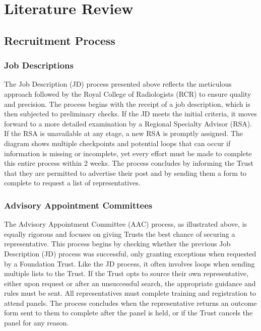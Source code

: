 \section{Literature Review}
\subsection{Recruitment Process}
\subsubsection{Job Descriptions}
    \noindent
{}
The Job Description (JD) process presented above reflects the meticulous approach followed by the Royal College of Radiologists (RCR) to ensure quality and precision. The process begins with the receipt of a job description, which is then subjected to preliminary checks. If the JD meets the initial criteria, it moves forward to a more detailed examination by a Regional Specialty Advisor (RSA). If the RSA is unavailable at any stage, a new RSA is promptly assigned. The diagram shows multiple checkpoints and potential loops that can occur if information is missing or incomplete, yet every effort must be made to complete this entire process within 2 weeks. The process concludes by informing the Trust that they are permitted to advertise their post and by sending them a form to complete to request a list of representatives.
\subsubsection{Advisory Appointment Committees}
    \noindent
{}
The Advisory Appointment Committee (AAC) process, as illustrated above, is equally rigorous and focuses on giving Trusts the best chance of securing a representative. This process begins by checking whether the previous Job Description (JD) process was successful, only granting exceptions when requested by a Foundation Trust. Like the JD process, it often involves loops when sending multiple lists to the Trust. If the Trust opts to source their own representative, either upon request or after an unsuccessful search, the appropriate guidance and rules must be sent. All representatives must complete training and registration to attend panels. The process concludes when the representative returns an outcome form sent to them to complete after the panel is held, or if the Trust cancels the panel for any reason.
